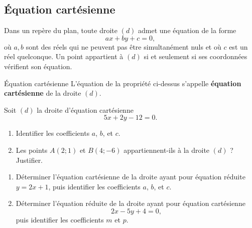 \documentclass[11pt]{article}
\begin{document}
\subsection{Équation cartésienne}
\begin{prop}
  Dans un repère du plan, toute droite $(d)$ admet une équation de la forme
  \[
    ax + by + c = 0,
  \]
  où $a, b$ sont des réels qui ne peuvent pas être simultanément nuls et où $c$
  est un réel quelconque. Un point appartient à $(d)$ si et seulement si ses
  coordonnées vérifient son équation.
\end{prop}
\begin{defi}{Équation cartésienne}
  L'équation de la propriété ci-dessus s'appelle \textbf{équation cartésienne}
  de la droite $(d)$.
\end{defi}

\begin{app}
  Soit $(d)$ la droite d'équation cartésienne
  \[
    5x + 2y - 12 = 0.
  \]
  \begin{enumerate}
    \item Identifier les coefficients $a$, $b$, et $c$.
    \item Les points $A\left( 2; 1 \right)$ et $B\left( 4; -6 \right)$
      appartiennent-ils à la droite $(d)$ ? Justifier.
  \end{enumerate}
\end{app}

\begin{app}
  \begin{enumerate}
    \item Déterminer l'équation cartésienne de la droite ayant pour équation réduite
      $y=2x+1$, puis identifier les coefficients $a$, $b$, et $c$.
    \item Déterminer l'équation réduite de la droite ayant pour équation
      cartésienne
      \[
        2x - 5y + 4 = 0,
      \]
      puis identifier les coefficients $m$ et $p$.
  \end{enumerate}
\end{app}
\end{document}
